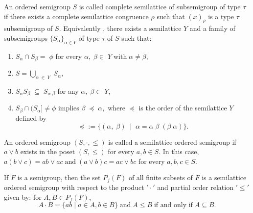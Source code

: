 \documentclass[13pt]{article}
\theoremstyle{definition}
\theoremstyle{remark}
\numberwithin{equation}{section}
\begin{document}
An ordered semigroup $S$  is called complete semilattice of
subsemigroup of type $\tau$ if there exists a complete semilattice
congruence $\rho $ such that $(x)_{\rho}$ is a type $\tau$
subsemigroup of $S$. Equivalently \cite{Ke1990}, there exists a
semilattice $Y$ and a family of subsemigroups $\{S_\alpha\}_{\alpha
\in Y}$ of type $\tau$ of $S$ such that:
\begin{enumerate}
\item \vspace{-.4cm}
$S_{\alpha}\cap S_{\beta}= \;\phi$ for every $\alpha, \;\beta \in
\;Y \;\textrm{with} \; \alpha \neq \beta,$
\item \vspace{-.4cm}
$S=\bigcup _{\alpha \;\in \;Y} \;S_{\alpha},$
\item \vspace{-.4cm}
$S_{\alpha}S_{\beta} \;\subseteq \;S_{\alpha \;\beta}$ for any
$\alpha, \;\beta \in \;Y,$
\item \vspace{-.4cm}
$S_{\beta}\cap (S_{\alpha}]\neq \phi$ implies $\beta \;\preceq
\;\alpha,$ where $\preceq$ is the order of the semilattice $Y$
defined by
$$ \preceq:=\{(\alpha,\;\beta)\;\mid
\;\alpha=\alpha\;\beta\;(\beta\;\alpha)\}. $$
\end{enumerate}

An ordered semigroup $(S, \cdot, \leq)$ is called a semilattice
ordered semigroup if $a \vee b$ exists in the poset $(S, \leq )$ for
every $a, b \in S$. In this case, $ a(b \vee c)=ab \vee ac \;
\textrm{and} \; (a \vee b)c=ac \vee bc $ for every $a, b, c \in S$.

If $F$ is a semigroup, then the set $P_f(F)$ of all finite subsets
of $F$ is a semilattice ordered semigroup with respect to the
product $'\cdot'$ and partial order relation $'\leq'$ given by: for
$A, B \in P_f(F)$,
$$ A \cdot B = \{ab \mid a \in A, b \in B\} \;
\textrm{and} \; A \leq B \; \textrm{if and  only  if} \; A \subseteq
B. $$
\end{document}
